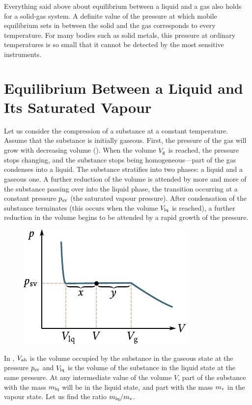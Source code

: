 Everything said above about equilibrium between a liquid and a gas also holds for a solid-gas system. A definite value of the pressure at which mobile equilibrium sets in between the solid and the gas corresponds to every temperature. For many bodies such as solid metals, this pressure at ordinary temperatures is so small that it cannot be detected by the most sensitive instruments.

\section{Equilibrium Between a Liquid and Its Saturated Vapour}\label{sec:15_3}

Let us consider the compression of a substance at a constant temperature. Assume that the substance is initially gaseous. First, the pressure of the gas will grow with decreasing volume (). When the volume $V_{\text{g}}$ is reached, the pressure stops changing, and the substance stops being homogeneous---part of the gas condenses into a liquid. The substance stratifies into two phases: a liquid and a gaseous one. A further reduction of the volume is attended by more and more of the substance passing over into the liquid phase, the transition occurring at a constant pressure $p_{\text{sv}}$ (the saturated vapour pressure). After condensation of the substance terminates (this occurs when the volume $V_{\text{lq}}$ is reached), a further reduction in the volume begins to be attended by a rapid growth of the pressure.

\begin{figure}[t]
	\begin{center}
		\includegraphics[scale=1]{figures/ch_15/fig_15_3.pdf}
		\caption[]{}
		\label{fig:15_3}
	\end{center}
	\vspace{-0.8cm}
\end{figure}

In , $V_{\text{ab}}$ is the volume occupied by the substance in the gaseous state at the pressure $p_{\text{sv}}$ and $V_{\text{lq}}$ is the volume of the substance in the liquid state at the same pressure. At any intermediate value of the volume $V$, part of the substance with the mass $m_{\text{lq}}$ will be in the liquid state, and part with the mass $m_{\text{v}}$ in the vapour state. Let us find the ratio $m_{\text{lq}}/m_{\text{v}}$.

